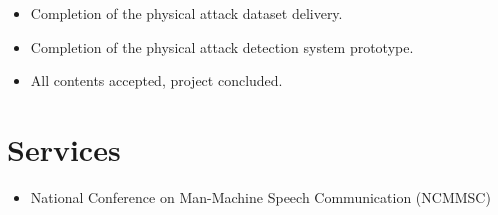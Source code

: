 \documentclass{resume}
\begin{document}
\begin{itemize}
  \item Completion of the physical attack dataset delivery.
  \item Completion of the physical attack detection system prototype.
  \item All contents accepted, project concluded.
\end{itemize}

\section{Services}
\begin{itemize}
  \item National Conference on Man-Machine Speech Communication (NCMMSC)
\end{itemize}



%
%
\end{document}
